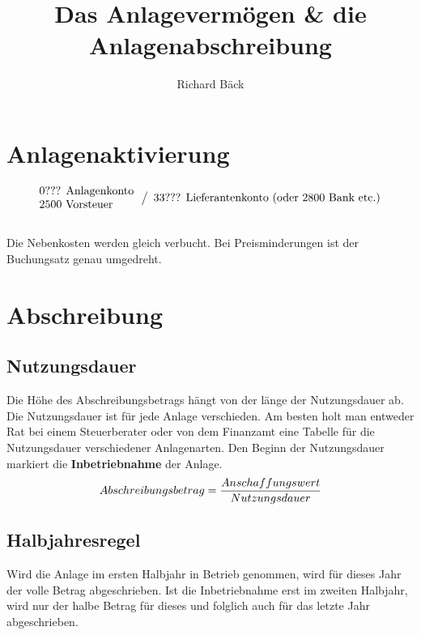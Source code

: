 \documentclass[a4paper,9pt]{article}
\title{Das Anlagevermögen \& die Anlagenabschreibung}
\author{Richard Bäck}
\begin{document}
\maketitle
\thispagestyle{fancy}

\section{Anlagenaktivierung}
\label{sec:anlagenaktivierung}
\begin{equation*}
  \label{eq:anschaffungsbuchung}
  \begin{array}{l}
    \text{0??? Anlagenkonto}\\
    \text{2500 Vorsteuer}\\
  \end{array}
  \left\slash
  \begin{array}{l}
    \text{33??? Lieferantenkonto (oder 2800 Bank etc.)}\\
  \end{array}
\right.
\end{equation*}
\\
Die Nebenkosten werden gleich verbucht. Bei Preisminderungen ist der
Buchungsatz genau umgedreht.

\section{Abschreibung}
\subsection{Nutzungsdauer}
Die Höhe des Abschreibungsbetrags hängt von der länge der
Nutzungsdauer ab. Die Nutzungsdauer ist für jede Anlage
verschieden. Am besten holt man entweder Rat bei einem Steuerberater
oder von dem Finanzamt eine Tabelle für die Nutzungsdauer
verschiedener Anlagenarten. Den Beginn der Nutzungsdauer markiert die
\textbf{Inbetriebnahme} der Anlage.
\begin{equation}
  Abschreibungsbetrag = { Anschaffungswert \over Nutzungsdauer }
\end{equation}

\subsection{Halbjahresregel}
Wird die Anlage im ersten Halbjahr in Betrieb genommen, wird für
dieses Jahr der volle Betrag abgeschrieben. Ist die Inbetriebnahme
erst im zweiten Halbjahr, wird nur der halbe Betrag für dieses und
folglich auch für das letzte Jahr abgeschrieben.
\end{document}
